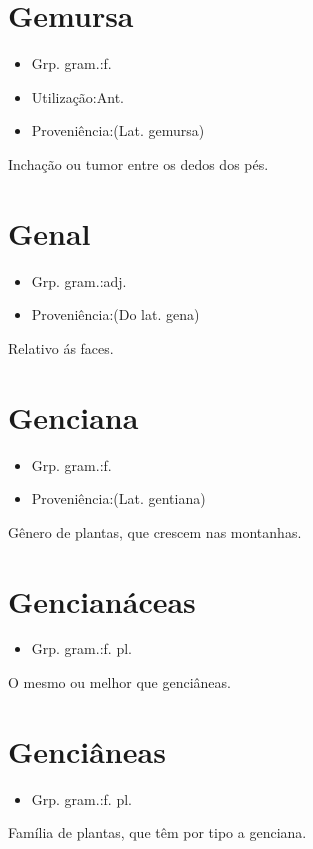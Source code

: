 \section{Gemursa}
\begin{itemize}
\item {Grp. gram.:f.}
\end{itemize}
\begin{itemize}
\item {Utilização:Ant.}
\end{itemize}
\begin{itemize}
\item {Proveniência:(Lat. \textunderscore gemursa\textunderscore )}
\end{itemize}
Inchação ou tumor entre os dedos dos pés.
\section{Genal}
\begin{itemize}
\item {Grp. gram.:adj.}
\end{itemize}
\begin{itemize}
\item {Proveniência:(Do lat. \textunderscore gena\textunderscore )}
\end{itemize}
Relativo ás faces.
\section{Genciana}
\begin{itemize}
\item {Grp. gram.:f.}
\end{itemize}
\begin{itemize}
\item {Proveniência:(Lat. \textunderscore gentiana\textunderscore )}
\end{itemize}
Gênero de plantas, que crescem nas montanhas.
\section{Gencianáceas}
\begin{itemize}
\item {Grp. gram.:f. pl.}
\end{itemize}
O mesmo ou melhor que \textunderscore genciâneas\textunderscore .
\section{Genciâneas}
\begin{itemize}
\item {Grp. gram.:f. pl.}
\end{itemize}
Família de plantas, que têm por tipo a genciana.
